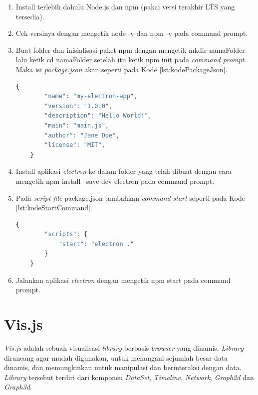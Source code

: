 \begin{enumerate}
    \item Install terlebih dahulu Node.js dan npm (pakai versi terakhir LTS yang tersedia).
    \item Cek versinya dengan mengetik node -v dan npm -v pada command prompt.
    \item Buat folder dan inisialisasi paket npm dengan mengetik mkdir namaFolder lalu ketik cd namaFolder setelah itu ketik npm init pada \textit{command prompt}. Maka isi \textit{package.json} akan seperti pada Kode \ref{lst:kodePackageJson}.
    
    \begin{lstlisting}[language=JavaScript, caption=Package.json\label{lst:kodePackageJson}]
    {
        "name": "my-electron-app",
        "version": "1.0.0",
        "description": "Hello World!",
        "main": "main.js",
        "author": "Jane Doe",
        "license": "MIT",
    }
    \end{lstlisting}
    \item Install aplikasi \textit{electron} ke dalam folder yang telah dibuat dengan cara mengetik npm install --save-dev electron pada command prompt.
    \item Pada \textit{script file} package.json tambahkan \textit{command start} seperti pada Kode \ref{lst:kodeStartCommand}.
    
    \begin{lstlisting}[language=JavaScript, caption=\textit{Start command}\label{lst:kodeStartCommand}]
    {
        "scripts": {
            "start": "electron ."
        }
    }
    \end{lstlisting}
    \item Jalankan aplikasi \textit{electron} dengan mengetik npm start pada command prompt.
\end{enumerate}

\newpage
\section{Vis.js}
\textit{Vis.js} adalah sebuah visualisasi \textit{library} berbasis \textit{browser} yang dinamis. \textit{Library} dirancang agar mudah digunakan, untuk menangani sejumlah besar data dinamis, dan memungkinkan untuk manipulasi dan berinteraksi dengan data. \textit{Library} tersebut terdiri dari komponen \textit{DataSet}, \textit{Timeline}, \textit{Network}, \textit{Graph2d} dan \textit{Graph3d}. \cite{visjs}

